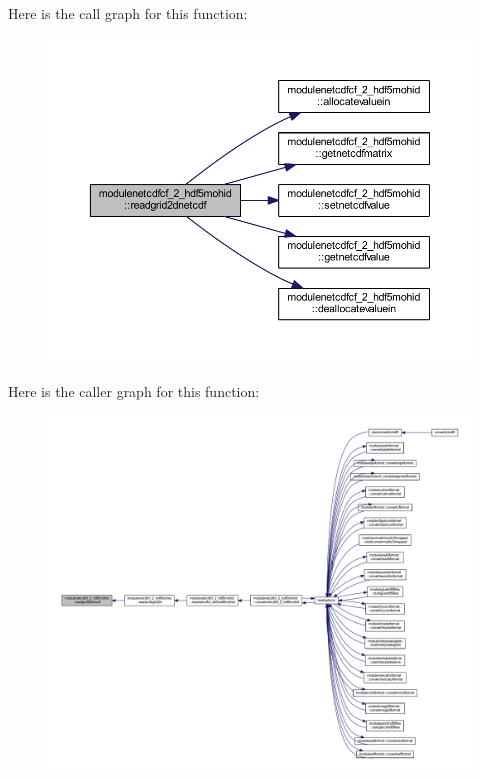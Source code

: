 Here is the call graph for this function\+:\nopagebreak
\begin{figure}[H]
\begin{center}
\leavevmode
\includegraphics[width=350pt]{namespacemodulenetcdfcf__2__hdf5mohid_a551caefae44a438a2446fd263b4b51e7_cgraph}
\end{center}
\end{figure}
Here is the caller graph for this function\+:\nopagebreak
\begin{figure}[H]
\begin{center}
\leavevmode
\includegraphics[width=350pt]{namespacemodulenetcdfcf__2__hdf5mohid_a551caefae44a438a2446fd263b4b51e7_icgraph}
\end{center}
\end{figure}
\mbox{\label{namespacemodulenetcdfcf__2__hdf5mohid_a6fedd55132323077153e16ddf06c3fc1}} 
